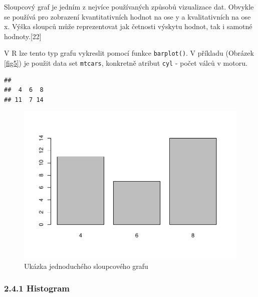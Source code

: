 \documentclass[12pt,]{article}
\newenvironment{Shaded}{\begin{snugshade}}{\end{snugshade}}
\newcommand{\KeywordTok}[1]{\textcolor[rgb]{0.13,0.29,0.53}{\textbf{#1}}}
\newcommand{\OperatorTok}[1]{\textcolor[rgb]{0.81,0.36,0.00}{\textbf{#1}}}
\newcommand{\NormalTok}[1]{#1}
\begin{document}
\qquad Sloupcový graf je jedním z nejvíce používaných způsobů
vizualizace dat. Obvykle se používá pro zobrazení kvantitativních hodnot
na ose y a kvalitativních na ose x. Výška sloupců může reprezentovat jak
četnosti výskytu hodnot, tak i samotné hodnoty.{[}22{]}

\qquad V R lze tento typ grafu vykreslit pomocí funkce
\texttt{barplot()}. V příkladu (Obrázek \ref{fig5}) je použit data set
\texttt{mtcars}, konkretně atribut \texttt{cyl} - počet válců v motoru.

\begin{Shaded}
\end{Shaded}

\begin{verbatim}
## 
##  4  6  8 
## 11  7 14
\end{verbatim}

\begin{Shaded}
\end{Shaded}

\begin{figure}[H]

{\centering \includegraphics[width=0.55\linewidth]{BP_files/figure-latex/barplot-1} 

}

\caption{\label{fig5} Ukázka jednoduchého sloupcového grafu}\label{fig:barplot}
\end{figure}

\hypertarget{hist}{\subsubsection{2.4.1 Histogram}\label{hist}}
\end{document}
